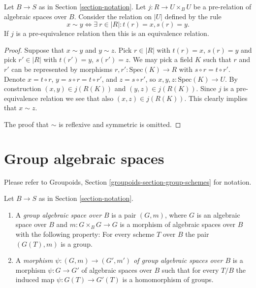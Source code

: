 \begin{lemma}
\label{lemma-pre-equivalence-equivalence-relation-points}
Let $B \to S$ as in Section \ref{section-notation}.
Let $j : R \to U \times_B U$ be a pre-relation of algebraic spaces over $B$.
Consider the relation on $|U|$ defined by the rule
$$
x \sim y
\Leftrightarrow
\exists\ r \in |R| :
t(r) = x,
s(r) = y.
$$
If $j$ is a pre-equivalence relation then this is an equivalence relation.
\end{lemma}

\begin{proof}
Suppose that $x \sim y$ and $y \sim z$.
Pick $r \in |R|$ with $t(r) = x$, $s(r) = y$ and
pick $r' \in |R|$ with $t(r') = y$, $s(r') = z$.
We may pick a field $K$ such that $r$ and $r'$ can be
represented by morphisms $r, r' : \text{Spec}(K) \to R$
with $s \circ r = t \circ r'$.
Denote $x = t \circ r$, $y = s \circ r = t \circ r'$,
and $z = s \circ r'$, so $x,y,z : \text{Spec}(K) \to U$.
By construction $(x, y) \in j(R(K))$ and
$(y, z) \in j(R(K))$. Since $j$ is a pre-equivalence relation
we see that also $(x, z) \in j(R(K))$.
This clearly implies that $x \sim z$.

\medskip\noindent
The proof that $\sim$ is reflexive and symmetric is omitted.
\end{proof}















\section{Group algebraic spaces}
\label{section-group-spaces}

\noindent
Please refer to
Groupoids, Section \ref{groupoids-section-group-schemes}
for notation.

\begin{definition}
\label{definition-group-space}
Let $B \to S$ as in Section \ref{section-notation}.
\begin{enumerate}
\item A {\it group algebraic space over $B$} is a pair $(G, m)$, where
$G$ is an algebraic space over $B$ and $m : G \times_B G \to G$ is
a morphism of algebraic spaces over $B$ with the following property:
For every scheme $T$ over $B$ the pair $(G(T), m)$ is a group.
\item A {\it morphism $\psi : (G, m) \to (G', m')$ of
group algebraic spaces over $B$}
is a morphism $\psi : G \to G'$ of algebraic spaces over $B$ such that for
every $T/B$ the induced map $\psi : G(T) \to G'(T)$ is a homomorphism
of groups.
\end{enumerate}
\end{definition}

